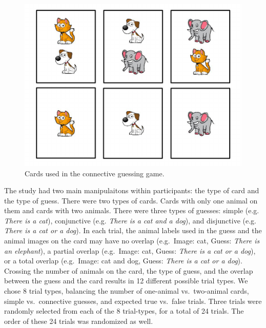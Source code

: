 \documentclass[floatsintext,man]{apa6}
\theoremstyle{definition}
\theoremstyle{definition}
\theoremstyle{definition}
\theoremstyle{remark}
\begin{document}
\begin{figure}
\centering
\includegraphics{writeup_files/figure-latex/stimuli-1.pdf}
\caption{\label{fig:stimuli}Cards used in the connective guessing game.}
\end{figure}

The study had two main manipulaitons within participants: the type of
card and the type of guess. There were two types of cards. Cards with
only one animal on them and cards with two animals. There were three
types of guesses: simple (e.g. \emph{There is a cat}), conjunctive (e.g.
\emph{There is a cat and a dog}), and disjunctive (e.g. \emph{There is a
cat or a dog}). In each trial, the animal labels used in the guess and
the animal images on the card may have no overlap (e.g.~Image: cat,
Guess: \emph{There is an elephant}), a partial overlap (e.g.~Image: cat,
Guess: \emph{There is a cat or a dog}), or a total overlap (e.g.~Image:
cat and dog, Guess: \emph{There is a cat or a dog}). Crossing the number
of animals on the card, the type of guess, and the overlap between the
guess and the card results in 12 different possible trial types. We
chose 8 trial types, balancing the number of one-animal vs.~two-animal
cards, simple vs.~connective guesses, and expected true vs.~false
trials. Three trials were randomly selected from each of the 8
trial-types, for a total of 24 trials. The order of these 24 trials was
randomized as well.
\end{document}
